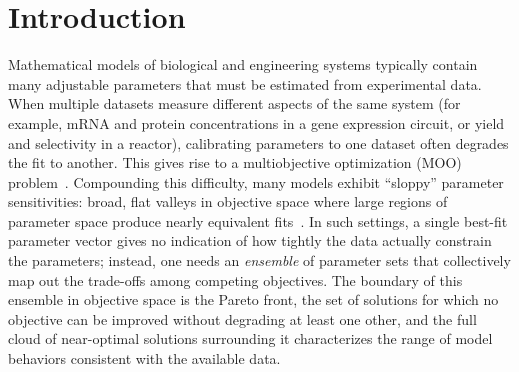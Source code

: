 \documentclass[12pt]{article}
\begin{document}
\section{Introduction}\label{sec:intro}
Mathematical models of biological and engineering systems typically contain many adjustable parameters that must be estimated from experimental data. When multiple datasets measure different aspects of the same system (for example, mRNA and protein concentrations in a gene expression circuit, or yield and selectivity in a reactor), calibrating parameters to one dataset often degrades the fit to another. This gives rise to a multiobjective optimization (MOO) problem~\cite{Miettinen1999,Deb2001,CoelloCoello2007}. Compounding this difficulty, many models exhibit ``sloppy'' parameter sensitivities: broad, flat valleys in objective space where large regions of parameter space produce nearly equivalent fits~\cite{Gutenkunst2007}. In such settings, a single best-fit parameter vector gives no indication of how tightly the data actually constrain the parameters; instead, one needs an \emph{ensemble} of parameter sets that collectively map out the trade-offs among competing objectives. The boundary of this ensemble in objective space is the Pareto front, the set of solutions for which no objective can be improved without degrading at least one other, and the full cloud of near-optimal solutions surrounding it characterizes the range of model behaviors consistent with the available data.
\end{document}
